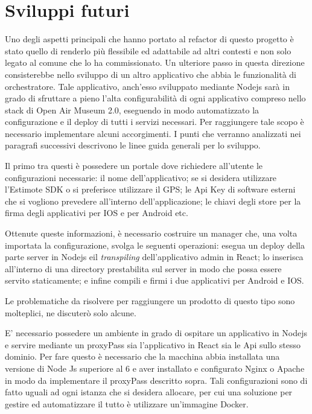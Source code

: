 \chapter{Sviluppi futuri}
\label{cha:intro}
\vspace{5mm}

Uno degli aspetti principali che hanno portato al refactor di questo progetto è stato quello di renderlo più flessibile ed adattabile ad altri contesti e non solo legato al comune che lo ha commissionato. Un ulteriore passo in questa direzione consisterebbe nello sviluppo di un altro applicativo che abbia le funzionalità di orchestratore. Tale applicativo, anch'esso sviluppato mediante Nodejs sarà in grado di sfruttare a pieno l’alta configurabilità di ogni applicativo compreso nello stack di Open Air Museum 2.0, eseguendo in modo automatizzato la configurazione e il deploy di tutti i servizi necessari. Per raggiungere tale scopo è necessario implementare alcuni accorgimenti. I punti che verranno analizzati nei paragrafi successivi descrivono le linee guida generali per lo sviluppo.\vspace{5mm}

Il primo tra questi è possedere un portale dove richiedere all’utente le configurazioni necessarie: il nome dell’applicativo; se si desidera utilizzare l’Estimote SDK o si preferisce utilizzare il GPS; le Api Key di software esterni che si vogliono prevedere all'interno dell'applicazione; le chiavi degli store per la firma degli applicativi per IOS e per Android etc.\vspace{5mm}

Ottenute queste informazioni, è necessario costruire un manager che, una volta importata la configurazione, svolga le seguenti operazioni: esegua un deploy della parte server in Nodejs eil \emph{transpiling} dell'applicativo admin in React; lo inserisca all’interno di una directory prestabilita sul server in modo che possa essere servito staticamente; e infine compili e firmi i due applicativi per Android e IOS. \vspace{5mm}

Le problematiche da risolvere per raggiungere un prodotto di questo tipo sono molteplici, ne discuterò solo alcune.\vspace{5mm}

E’ necessario possedere un ambiente in grado di ospitare un applicativo in Nodejs e servire mediante un proxyPass sia l’applicativo in React sia le Api sullo stesso dominio. Per fare questo è necessario che la macchina abbia installata una versione di Node Js superiore al 6 e aver installato e configurato Nginx o Apache in modo da implementare il proxyPass descritto sopra. Tali configurazioni sono di fatto uguali ad ogni istanza che si desidera allocare, per cui una soluzione per gestire ed automatizzare il tutto è utilizzare un'immagine Docker.\vspace{5mm}

